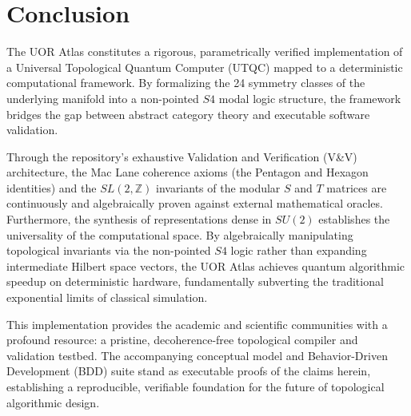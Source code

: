 \section{Conclusion}

The UOR Atlas constitutes a rigorous, parametrically verified implementation of a Universal Topological Quantum Computer (UTQC) mapped to a deterministic computational framework. By formalizing the 24 symmetry classes of the underlying manifold into a non-pointed $S4$ modal logic structure, the framework bridges the gap between abstract category theory and executable software validation.

Through the repository's exhaustive Validation and Verification (V\&V) architecture, the Mac Lane coherence axioms (the Pentagon and Hexagon identities) and the $SL(2, \mathbb{Z})$ invariants of the modular $S$ and $T$ matrices are continuously and algebraically proven against external mathematical oracles. Furthermore, the synthesis of representations dense in $SU(2)$ establishes the universality of the computational space. By algebraically manipulating topological invariants via the non-pointed $S4$ logic rather than expanding intermediate Hilbert space vectors, the UOR Atlas achieves quantum algorithmic speedup on deterministic hardware, fundamentally subverting the traditional exponential limits of classical simulation.

This implementation provides the academic and scientific communities with a profound resource: a pristine, decoherence-free topological compiler and validation testbed. The accompanying conceptual model and Behavior-Driven Development (BDD) suite stand as executable proofs of the claims herein, establishing a reproducible, verifiable foundation for the future of topological algorithmic design.

